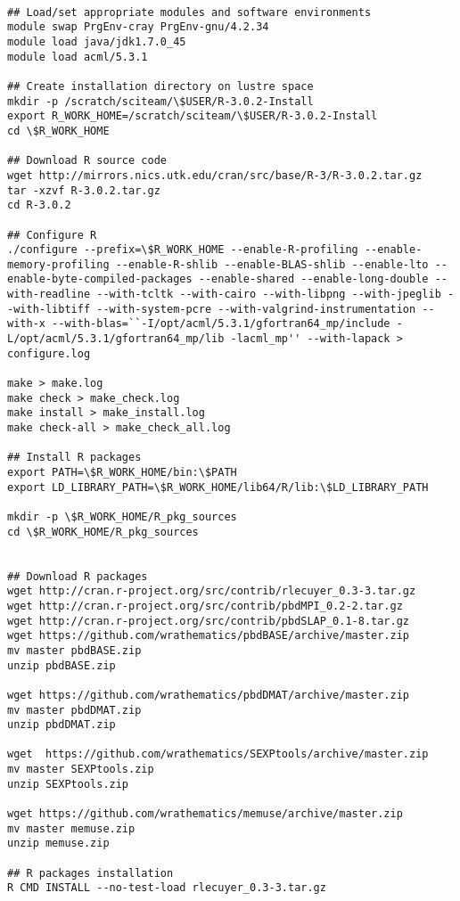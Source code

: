 \vspace*{-.5cm}
\begin{lstlisting}[language=bashy]

## Load/set appropriate modules and software environments 
module swap PrgEnv-cray PrgEnv-gnu/4.2.34
module load java/jdk1.7.0_45
module load acml/5.3.1

## Create installation directory on lustre space
mkdir -p /scratch/sciteam/\$USER/R-3.0.2-Install
export R_WORK_HOME=/scratch/sciteam/\$USER/R-3.0.2-Install
cd \$R_WORK_HOME

## Download R source code 
wget http://mirrors.nics.utk.edu/cran/src/base/R-3/R-3.0.2.tar.gz
tar -xzvf R-3.0.2.tar.gz
cd R-3.0.2

## Configure R
./configure --prefix=\$R_WORK_HOME --enable-R-profiling --enable-memory-profiling --enable-R-shlib --enable-BLAS-shlib --enable-lto --enable-byte-compiled-packages --enable-shared --enable-long-double --with-readline --with-tcltk --with-cairo --with-libpng --with-jpeglib --with-libtiff --with-system-pcre --with-valgrind-instrumentation --with-x --with-blas=``-I/opt/acml/5.3.1/gfortran64_mp/include -L/opt/acml/5.3.1/gfortran64_mp/lib -lacml_mp'' --with-lapack > configure.log

make > make.log
make check > make_check.log
make install > make_install.log
make check-all > make_check_all.log

## Install R packages
export PATH=\$R_WORK_HOME/bin:\$PATH
export LD_LIBRARY_PATH=\$R_WORK_HOME/lib64/R/lib:\$LD_LIBRARY_PATH

mkdir -p \$R_WORK_HOME/R_pkg_sources
cd \$R_WORK_HOME/R_pkg_sources


## Download R packages
wget http://cran.r-project.org/src/contrib/rlecuyer_0.3-3.tar.gz
wget http://cran.r-project.org/src/contrib/pbdMPI_0.2-2.tar.gz
wget http://cran.r-project.org/src/contrib/pbdSLAP_0.1-8.tar.gz
wget https://github.com/wrathematics/pbdBASE/archive/master.zip
mv master pbdBASE.zip
unzip pbdBASE.zip

wget https://github.com/wrathematics/pbdDMAT/archive/master.zip
mv master pbdDMAT.zip
unzip pbdDMAT.zip

wget  https://github.com/wrathematics/SEXPtools/archive/master.zip
mv master SEXPtools.zip
unzip SEXPtools.zip

wget https://github.com/wrathematics/memuse/archive/master.zip
mv master memuse.zip
unzip memuse.zip

## R packages installation
R CMD INSTALL --no-test-load rlecuyer_0.3-3.tar.gz


\end{lstlisting}
